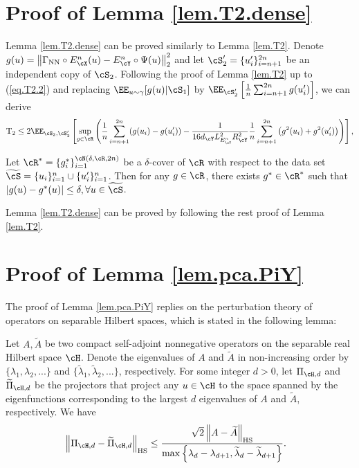 \documentclass[11pt]{article} %
\begin{document}
\section{Proof of Lemma \ref{lem.T2.dense}} \label{lem.T2.dense.proof}
Lemma \ref{lem.T2.dense} can be proved similarly to Lemma \ref{lem.T2}. 
Denote $g(u)= \left\|\Gamma_{\rm NN} \circ E_{\cX}^n(u)- E_{\cY}^n\circ\Psi(u)\right\|^2_2$ and let $\cS_2'=\{u_i'\}_{i=n+1}^{2n}$ be an independent copy of $\cS_2$. Following the proof of Lemma \ref{lem.T2} up to (\ref{eq.T2.2}) and replacing $\EE_{u\sim \gamma}[g(u)|\cS_1]$ by $\EE_{\cS_2'}\left[\frac{1}{n}\sum_{i=n+1}^{2n}g(u_i')\right]$, we can derive 
\begin{align}
	{\rm T_2}\leq 2\EE_{\cS_2,\cS_2'}\left[\sup_{g\in \cR}\left(\frac{1}{n}\sum_{i=n+1}^{2n} (g(u_i)-g(u'_i))-\frac{1}{16d_{\cY}L_{E^n_{\cY}}^2R_{\cY}^2}\frac{1}{n}\sum_{i=n+1}^{2n}\left(g^2(u_i)+g^2(u_i')\right)\right)\right],
	\label{eq.T2.2.dense}
\end{align}

Let $\cR^*=\{g_i^*\}_{i=1}^{\cN(\delta,\cR,2n)}$ be a $\delta$-cover of $\cR$ with respect to the data set $\widetilde{\cS}=\{u_i\}_{i=1}^n\cup\{u'_i\}_{i=1}^n$. Then for any $g\in \cR$, there exists $g^*\in \cR^*$ such that $|g(u)-g^*(u)|\leq \delta, \forall u\in \widetilde{\cS}$.

Lemma \ref{lem.T2.dense}  can be proved by following the rest proof of Lemma \ref{lem.T2}.

\section{Proof of Lemma \ref{lem.pca.PiY}}\label{lem.pca.PiY.proof}
The proof of Lemma \ref{lem.pca.PiY} replies on the perturbation theory of operators on separable Hilbert spaces, which is stated in the following lemma:
\begin{lemma} \label{lem.PCAHilbert}
	Let $A,\widetilde{A}$ be two compact self-adjoint nonnegative operators on the separable real Hilbert space $\cH$. Denote the eigenvalues of $A$ and $\widetilde{A}$ in non-increasing order by $\{\lambda_1,\lambda_2,...\}$ and $\{\widetilde{\lambda}_1,\widetilde{\lambda}_2,...\}$, respectively. For some integer $d>0$, let $\Pi_{\cH,d}$ and $\widetilde{\Pi}_{\cH,d}$ be the projectors that project any $u\in\cH$ to the space spanned by the eigenfunctions corresponding to the largest $d$ eigenvalues of $A$ and $\widetilde{A}$, respectively. 
	We have
	\begin{align}
		&\left\|\Pi_{\cH,d}-\widetilde{\Pi}_{\cH,d}\right\|_{\rm HS} \leq \frac{\sqrt{2}\left\|A-\widetilde{A}\right\|_{\rm HS}}{\max\left\{\lambda_d-\lambda_{d+1}, \widetilde{\lambda}_d-\widetilde{\lambda}_{d+1}\right\}}.
	\end{align}
\end{lemma}
\end{document}
